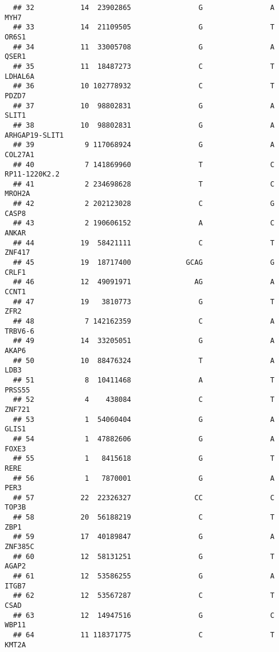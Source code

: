 \documentclass[12pt,twoside]{reedthesis}
\theoremstyle{definition}
\theoremstyle{definition}
\theoremstyle{remark}
\begin{document}
\begin{verbatim}
  ## 32           14  23902865                G                A           MYH7
  ## 33           14  21109505                G                T          OR6S1
  ## 34           11  33005708                G                A          QSER1
  ## 35           11  18487273                C                T        LDHAL6A
  ## 36           10 102778932                C                T          PDZD7
  ## 37           10  98802831                G                A          SLIT1
  ## 38           10  98802831                G                A ARHGAP19-SLIT1
  ## 39            9 117068924                G                A        COL27A1
  ## 40            7 141869960                T                C  RP11-1220K2.2
  ## 41            2 234698628                T                C         MROH2A
  ## 42            2 202123028                C                G          CASP8
  ## 43            2 190606152                A                C          ANKAR
  ## 44           19  58421111                C                T         ZNF417
  ## 45           19  18717400             GCAG                G          CRLF1
  ## 46           12  49091971               AG                A          CCNT1
  ## 47           19   3810773                G                T           ZFR2
  ## 48            7 142162359                C                A        TRBV6-6
  ## 49           14  33205051                G                A          AKAP6
  ## 50           10  88476324                T                A           LDB3
  ## 51            8  10411468                A                T         PRSS55
  ## 52            4    438084                C                T         ZNF721
  ## 53            1  54060404                G                A          GLIS1
  ## 54            1  47882606                G                A          FOXE3
  ## 55            1   8415618                G                T           RERE
  ## 56            1   7870001                G                A           PER3
  ## 57           22  22326327               CC                C          TOP3B
  ## 58           20  56188219                C                T           ZBP1
  ## 59           17  40189847                G                A        ZNF385C
  ## 60           12  58131251                G                T          AGAP2
  ## 61           12  53586255                G                A          ITGB7
  ## 62           12  53567287                C                T           CSAD
  ## 63           12  14947516                G                C          WBP11
  ## 64           11 118371775                C                T          KMT2A

\end{verbatim}
\end{document}
